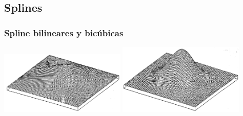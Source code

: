 \subsection{Splines}
\begin{frame}
    \frametitle{Spline bilineares y bicúbicas}
    \begin{center}
        \includegraphics[width=0.45\textwidth]{images/bilinear_spline.jpg}
        \includegraphics[width=0.45\textwidth]{images/bicubic_spline.jpg}
    \end{center}
\end{frame}
